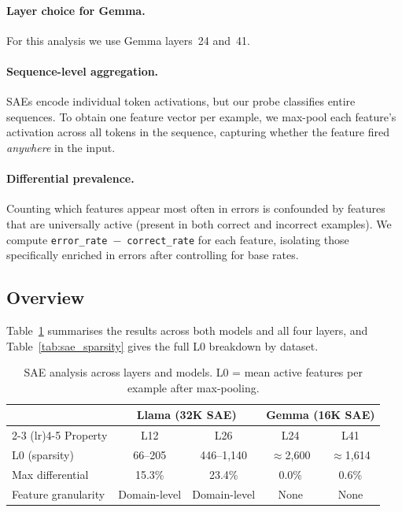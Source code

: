 \documentclass{article}
\begin{document}
\paragraph{Layer choice for Gemma.}
For this analysis we use Gemma layers~24 and~41.

\paragraph{Sequence-level aggregation.}
SAEs encode individual token activations, but our probe classifies entire
sequences.
To obtain one feature vector per example, we max-pool each feature's
activation across all tokens in the sequence, capturing whether the
feature fired \emph{anywhere} in the input.

\paragraph{Differential prevalence.}
Counting which features appear most often in errors is confounded by features
that are universally active (present in both correct and incorrect examples).
We compute \texttt{error\_rate}~$-$~\texttt{correct\_rate} for each feature,
isolating those specifically enriched in errors after controlling for base rates.

\subsection{Overview}

Table~\ref{tab:sae_comparison} summarises the results across both models
and all four layers, and Table~\ref{tab:sae_sparsity} gives the full L0
breakdown by dataset.

\begin{table}[t]
\centering
\caption{SAE analysis across layers and models.
  L0 = mean active features per example after max-pooling.}
\label{tab:sae_comparison}
\begin{tabular}{lcccc}
\toprule
                    & \multicolumn{2}{c}{Llama (32K SAE)} & \multicolumn{2}{c}{Gemma (16K SAE)} \\
\cmidrule(lr){2-3} \cmidrule(lr){4-5}
Property            & L12          & L26          & L24           & L41           \\
\midrule
L0 (sparsity)       & 66--205      & 446--1,140   & $\approx$2,600 & $\approx$1,614 \\
Max differential     & 15.3\%       & 23.4\%       & 0.0\%          & 0.6\%          \\
Feature granularity  & Domain-level & Domain-level & None           & None           \\
\bottomrule
\end{tabular}
\end{table}
\end{document}
